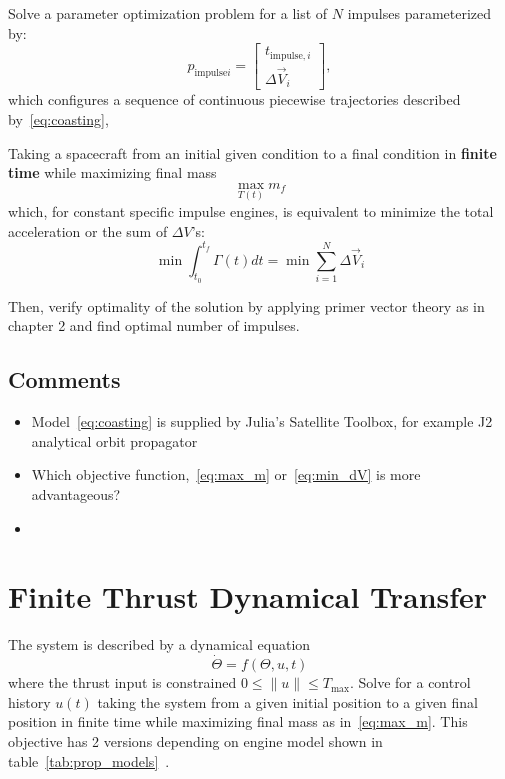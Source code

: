 Solve a parameter optimization problem for a list of \(N\) impulses parameterized by:
\begin{equation} 
    p_{\text{impulse}i} = \begin{bmatrix}
        t_{\text{impulse},i} \\
        \Delta \vec{V}_i
    \end{bmatrix},
\end{equation}
which configures a sequence of continuous piecewise trajectories described by~\eqref{eq:coasting},

Taking a spacecraft from an initial given condition to a final condition in \textbf{finite time} while maximizing final mass
\begin{equation} \label{eq:max_m}
    \max_{T(t)} m_f 
\end{equation}
which, for constant specific impulse engines, is equivalent to minimize the total acceleration or the sum of \(\Delta V\)'s:
\begin{equation} \label{eq:min_dV}
    \min \int_{t_0}^{t_f} \Gamma(t) dt = \min \sum_{i=1}^N \Delta \vec{V}_i
\end{equation}

Then, verify optimality of the solution by applying primer vector theory as in \cite{Conway_2010} chapter 2 and find optimal number of impulses.

\subsection{Comments}

\begin{itemize}
    \item Model~\eqref{eq:coasting} is supplied by Julia's Satellite Toolbox, for example J2 analytical orbit propagator
    \item Which objective function,~\eqref{eq:max_m} or~\eqref{eq:min_dV} is more advantageous?
    \item 
\end{itemize}

\section{Finite Thrust Dynamical Transfer}

The system is described by a dynamical equation
\begin{equation} \label{eq:dynamics}
    \dot \Theta = f(\Theta, u, t)
\end{equation}
where the thrust input is constrained \(0 \leq \lVert u \rVert \leq T_{\max}\). Solve for a control history \(u(t)\) taking the system from a given initial position to a given final position in finite time while maximizing final mass as in~\eqref{eq:max_m}. This objective has 2 versions depending on engine model shown in table~\ref{tab:prop_models}~\cite{Conway_2010}.

